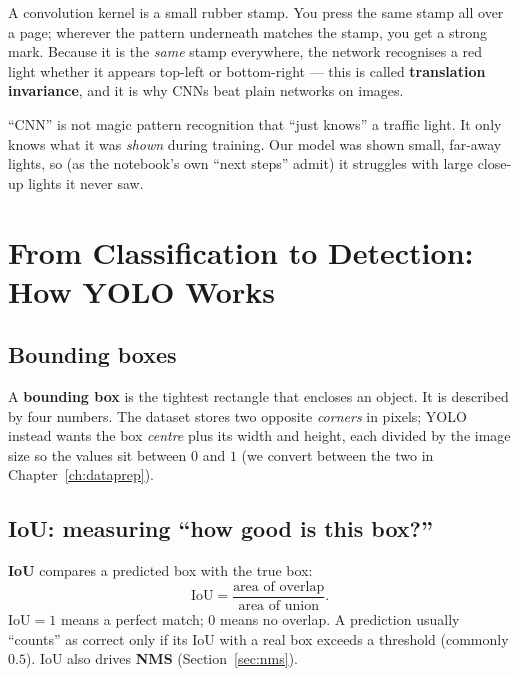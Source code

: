 \begin{analogy}
A convolution kernel is a small rubber stamp. You press the same stamp
all over a page; wherever the pattern underneath matches the stamp, you
get a strong mark. Because it is the \emph{same} stamp everywhere, the
network recognises a red light whether it appears top-left or
bottom-right --- this is called \textbf{translation invariance}, and it is
why CNNs beat plain networks on images.
\end{analogy}

\begin{warningbox}
``CNN'' is not magic pattern recognition that ``just knows'' a traffic
light. It only knows what it was \emph{shown} during training. Our model
was shown small, far-away lights, so (as the notebook's own ``next
steps'' admit) it struggles with large close-up lights it never saw.
\end{warningbox}

\chapter{From Classification to Detection: How YOLO Works}
\label{ch:yolo}

\section{Bounding boxes}
A \textbf{bounding box} is the tightest rectangle that encloses an
object. It is described by four numbers. The dataset stores two opposite
\emph{corners} in pixels; YOLO instead wants the box \emph{centre} plus
its width and height, each divided by the image size so the values sit
between $0$ and $1$ (we convert between the two in
Chapter~\ref{ch:dataprep}).

\section{IoU: measuring ``how good is this box?''}
\begin{keyconcept}
\textbf{IoU} compares a predicted box with the true box:
\[
\mathrm{IoU} = \frac{\text{area of overlap}}{\text{area of union}}.
\]
$\mathrm{IoU}=1$ means a perfect match; $0$ means no overlap. A
prediction usually ``counts'' as correct only if its IoU with a real box
exceeds a threshold (commonly $0.5$). IoU also drives \textbf{NMS}
(Section~\ref{sec:nms}).
\end{keyconcept}


